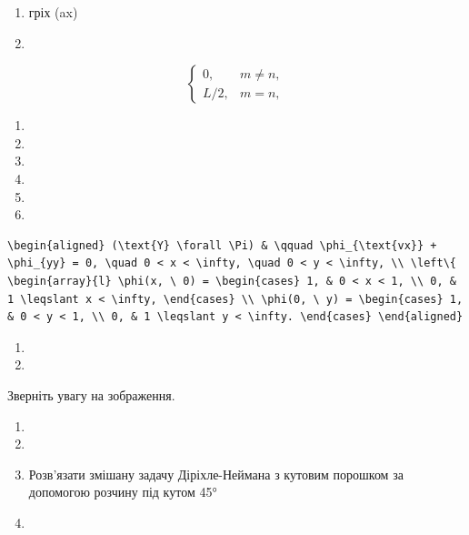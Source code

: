 \documentclass[
  ukrainian,
]{article}
\providecommand{\tightlist}{%
  \setlength{\itemsep}{0pt}\setlength{\parskip}{0pt}}
\begin{document}
\begin{enumerate}
\def\labelenumi{\arabic{enumi}.}
\setcounter{enumi}{19}
\item
  гріх (ax)
\item
\end{enumerate}

\[
\begin{cases} 0, & m \neq n, \\ L/2, & m = n, \end{cases}
\]

\begin{enumerate}
\def\labelenumi{\arabic{enumi}.}
\setcounter{enumi}{10}
\tightlist
\item
\item
\item
\item
\item
\item
\end{enumerate}

\begin{verbatim}
\begin{aligned} (\text{Y} \forall \Pi) & \qquad \phi_{\text{vx}} + \phi_{yy} = 0, \quad 0 < x < \infty, \quad 0 < y < \infty, \\ \left\{ \begin{array}{l} \phi(x, \ 0) = \begin{cases} 1, & 0 < x < 1, \\ 0, & 1 \leqslant x < \infty, \end{cases} \\ \phi(0, \ y) = \begin{cases} 1, & 0 < y < 1, \\ 0, & 1 \leqslant y < \infty. \end{cases} \end{aligned}
\end{verbatim}

\begin{enumerate}
\def\labelenumi{\arabic{enumi}.}
\setcounter{enumi}{16}
\tightlist
\item
\item
\end{enumerate}

Зверніть увагу на зображення.

\begin{enumerate}
\def\labelenumi{\arabic{enumi}.}
\setcounter{enumi}{18}
\item
\item
\item
  Розв'язати змішану задачу Діріхле-Неймана з кутовим порошком за
  допомогою розчину під кутом 45°
\item
\end{enumerate}
\end{document}
